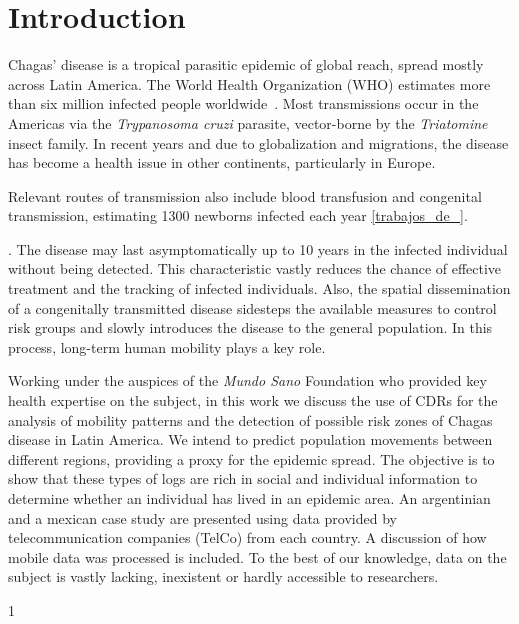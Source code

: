 \section{Introduction}

Chagas' disease is a tropical parasitic epidemic of global reach, spread mostly across Latin America. The World Health Organization (WHO) estimates more than six million infected people worldwide~\cite{who2016}. Most transmissions occur in the Americas via the \textit{Trypanosoma cruzi} parasite, vector-borne by the \textit{Triatomine} insect family. In recent years and due to globalization and migrations, the disease has become a health issue in other continents, particularly in Europe. 

Relevant routes of transmission also include blood transfusion and congenital transmission, estimating 1300 newborns infected each year \ref{trabajos_de_}.\begin{comment}  en el drive estan las ppt del min salud \end{comment}. The disease may last asymptomatically up to 10 years in the infected individual without being detected. This characteristic vastly reduces the chance of effective treatment and the tracking of infected individuals. Also, the spatial dissemination of a congenitally transmitted disease sidesteps the available measures to control risk groups and slowly introduces the disease to the general population. In this process, long-term human mobility plays a key role.

Working under the auspices of the \textit{Mundo Sano} Foundation who provided key health expertise on the subject, in this work we discuss the use of CDRs for the analysis of mobility patterns and the detection of possible risk zones of Chagas disease in Latin America. We intend to predict population movements between different regions, providing a proxy for the epidemic spread. The objective is to show that these types of logs are rich in social and individual information to determine whether an individual has lived in an epidemic area. An argentinian and a mexican case study are presented using data provided by telecommunication companies (TelCo) from each country. A discussion of how mobile data was processed is included. To the best of our knowledge, data on the subject is vastly lacking, inexistent or hardly accessible to researchers. 


1